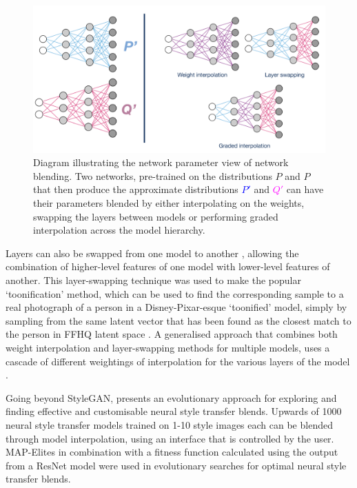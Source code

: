 \begin{figure}[!htbp]
    \centering
    \includegraphics[width=1\textwidth]{figures/c6_active_div/diagrams/network_blending.png}
    \caption[Diagram illustrating the network parameter view of network blending.]{Diagram illustrating the network parameter view of network blending. Two networks, pre-trained on the distributions $P$ and $P$ that then produce the approximate distributions \textcolor{blue}{$P'$} and \textcolor{magenta}{$Q'$} can have their parameters blended by either interpolating on the weights, swapping the layers between models or performing graded interpolation across the model hierarchy.}
  \label{fig:c6:network-blending}
  \end{figure}

Layers can also be swapped from one model to another \citep{pinkney2020interpolation}, allowing the combination of higher-level features of one model with lower-level features of another. 
This layer-swapping technique was used to make the popular `toonification' method, which can be used to find the corresponding sample to a real photograph of a person in a Disney-Pixar-esque `toonified' model, simply by sampling from the same latent vector that has been found as the closest match to the person in FFHQ latent space \citep{abdal2019image2stylegan}. 
A generalised approach that combines both weight interpolation and layer-swapping methods for multiple models, uses a cascade of different weightings of interpolation for the various layers of the model \citep{arfafax2020barycentricnotebook}.

Going beyond StyleGAN, \citet{colton2021evolving} presents an evolutionary approach for exploring and finding effective and customisable neural style transfer blends. 
Upwards of 1000 neural style transfer models trained on 1-10 style images each can be blended through model interpolation, using an interface that is controlled by the user. 
MAP-Elites \citep{mouret2015illuminating} in combination with a fitness function calculated using the output from a ResNet model \citep{he2016deep} were used in evolutionary searches for optimal neural style transfer blends. 

